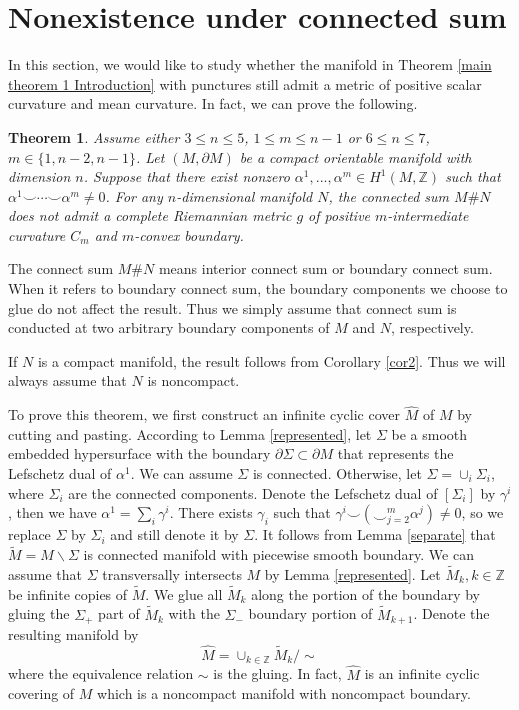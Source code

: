 \documentclass[11pt,letterpaper]{amsart}
\newtheorem{theorem}{Theorem}[section]
\theoremstyle{definition}
\theoremstyle{remark}
\numberwithin{equation}{section}
\begin{document}
\section{Nonexistence under connected sum}\label{section 4}
In this section, we would like to study whether the manifold in Theorem \ref{main theorem 1 Introduction} with punctures still admit a metric of positive scalar curvature and mean curvature. In fact, we can prove the following. 

\begin{theorem}\label{main theorem 2}
    Assume either $3\leq n\leq 5$, $1\leq m\leq n-1$ or $6\leq n\leq 7$, $m\in\{1,n-2,n-1\}$. Let $(M,\partial M)$ be a compact orientable manifold with dimension $n$. Suppose that there exist nonzero $  \alpha^{1},...,\alpha^{m}\in H^{1}(M,\mathbb{Z})$ such that $\alpha^{1}\smile\cdots\smile \alpha^{m}\neq 0$. For any $n$-dimensional manifold $N$, the connected sum $M\# N$ does not admit a complete Riemannian metric $g$ of positive $m$-intermediate curvature $C_{m}$ and $m$-convex boundary.
\end{theorem}

The connect sum $M\# N$ means interior connect sum or boundary connect sum. When it refers to boundary connect sum, the boundary components we choose to glue do not affect the result. Thus we simply assume that connect sum is conducted at two arbitrary boundary components of $M$ and $N$, respectively.

If $N$ is a compact manifold, the result follows from Corollary \ref{cor2}. Thus we will always assume that $N$ is noncompact.

To prove this theorem, we first construct an infinite cyclic cover $\hat{M}$ of $M$ by cutting and pasting. According to Lemma \ref{represented}, let $\Sigma$ be a smooth embedded hypersurface with the boundary $\partial\Sigma\subset 
\partial M$ that represents the Lefschetz dual of $\alpha^{1}$. We can assume $\Sigma$ is connected. Otherwise, let $\Sigma=\cup_{i}\Sigma_{i}$, where $\Sigma_{i}$ are the connected components. Denote the Lefschetz dual of $[\Sigma_{i}]$ by $\gamma^{i}$, then we have $\alpha^{1}=\sum_{i}\gamma^{i}$.  There exists $\gamma_{i}$ such that $\gamma^{i}\smile(\smile_{j=2}^{m}\alpha^{j})\neq 0$, so we replace $\Sigma$ by $\Sigma_{i}$ and still denote it by $\Sigma$. It  follows from Lemma \ref{separate} that $\tilde{M}=M\backslash \Sigma$ is connected manifold with piecewise smooth boundary. 
We can assume that $\Sigma$ transversally intersects $M$ by Lemma \ref{represented}. Let $\tilde{M}_k, k\in \mathbb{Z}$ be infinite copies of $\tilde{M}$. We glue all $\tilde{M}_k$ along the portion of the boundary by gluing the $\Sigma_+$ part of $\tilde{M}_k$ with the $\Sigma_-$ boundary portion of $\tilde{M}_{k+1}$. Denote the resulting manifold by
\[\hat{M}=\cup_{k\in\mathbb{Z}}\tilde{M}_k/{\sim}\]
where the equivalence relation $\sim$ is the gluing. In fact, $\hat{M}$ is an infinite cyclic covering of $M$ which is a noncompact manifold with noncompact boundary. 
\end{document}
